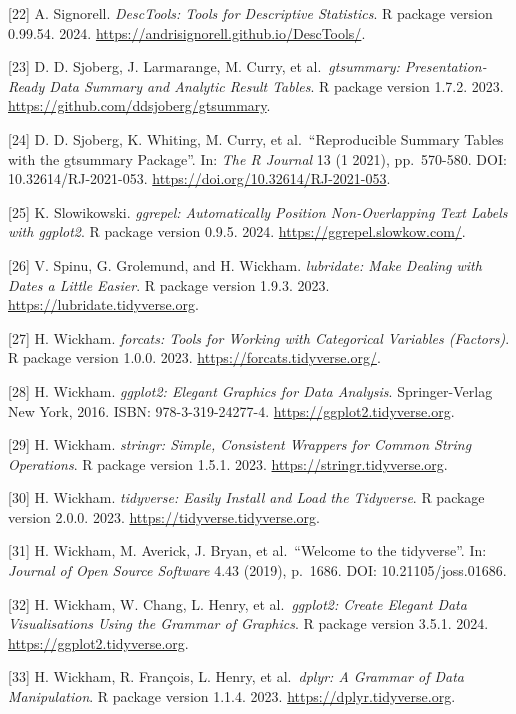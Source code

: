 \documentclass[
  letterpaper,
  DIV=11,
  numbers=noendperiod]{scrreprt}
\begin{document}
{[}22{]} A. Signorell. \emph{DescTools: Tools for Descriptive
Statistics}. R package version 0.99.54. 2024.
\url{https://andrisignorell.github.io/DescTools/}.

{[}23{]} D. D. Sjoberg, J. Larmarange, M. Curry, et al.~\emph{gtsummary:
Presentation-Ready Data Summary and Analytic Result Tables}. R package
version 1.7.2. 2023. \url{https://github.com/ddsjoberg/gtsummary}.

{[}24{]} D. D. Sjoberg, K. Whiting, M. Curry, et al.~``Reproducible
Summary Tables with the gtsummary Package''. In: \emph{The R Journal} 13
(1 2021), pp.~570-580. DOI: 10.32614/RJ-2021-053.
\url{https://doi.org/10.32614/RJ-2021-053}.

{[}25{]} K. Slowikowski. \emph{ggrepel: Automatically Position
Non-Overlapping Text Labels with ggplot2}. R package version 0.9.5.
2024. \url{https://ggrepel.slowkow.com/}.

{[}26{]} V. Spinu, G. Grolemund, and H. Wickham. \emph{lubridate: Make
Dealing with Dates a Little Easier}. R package version 1.9.3. 2023.
\url{https://lubridate.tidyverse.org}.

{[}27{]} H. Wickham. \emph{forcats: Tools for Working with Categorical
Variables (Factors)}. R package version 1.0.0. 2023.
\url{https://forcats.tidyverse.org/}.

{[}28{]} H. Wickham. \emph{ggplot2: Elegant Graphics for Data Analysis}.
Springer-Verlag New York, 2016. ISBN: 978-3-319-24277-4.
\url{https://ggplot2.tidyverse.org}.

{[}29{]} H. Wickham. \emph{stringr: Simple, Consistent Wrappers for
Common String Operations}. R package version 1.5.1. 2023.
\url{https://stringr.tidyverse.org}.

{[}30{]} H. Wickham. \emph{tidyverse: Easily Install and Load the
Tidyverse}. R package version 2.0.0. 2023.
\url{https://tidyverse.tidyverse.org}.

{[}31{]} H. Wickham, M. Averick, J. Bryan, et al.~``Welcome to the
tidyverse''. In: \emph{Journal of Open Source Software} 4.43 (2019),
p.~1686. DOI: 10.21105/joss.01686.

{[}32{]} H. Wickham, W. Chang, L. Henry, et al.~\emph{ggplot2: Create
Elegant Data Visualisations Using the Grammar of Graphics}. R package
version 3.5.1. 2024. \url{https://ggplot2.tidyverse.org}.

{[}33{]} H. Wickham, R. François, L. Henry, et al.~\emph{dplyr: A
Grammar of Data Manipulation}. R package version 1.1.4. 2023.
\url{https://dplyr.tidyverse.org}.
\end{document}
